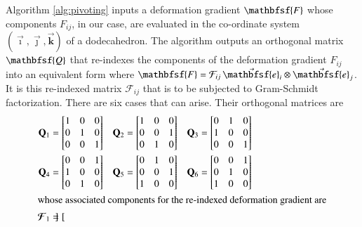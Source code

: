 Algorithm \ref{alg:pivoting} inputs a deformation gradient $\mathbfsf{F}$ whose components $F_{ij}$, in our case, are evaluated in the co-ordinate system $(  \vec{\boldsymbol{\imath}} , \vec{\boldsymbol{\jmath}} , \vec{\boldsymbol{k}} )$ of a dodecahedron.  The algorithm outputs an orthogonal matrix $\mathbfsf{Q}$ that re-indexes the components of the deformation gradient $F_{ij}$ into an equivalent form where $\mathbfsf{F} = \mathcal{F}_{ij} \, \vec{\mathbfsf{e}}_i \otimes \vec{\mathbfsf{e}}_j$.  It is this re-indexed matrix $\mathcal{F}_{ij}$ that is to be subjected to Gram-Schmidt factorization.  There are six cases that can arise.  Their orthogonal matrices are
\begin{subequations}
    \begin{align}
    \mathbf{Q}_1 & = \begin{bmatrix}
    1 & 0 & 0\\
    0 & 1 & 0\\
    0 & 0 & 1
    \end{bmatrix} & 
    \mathbf{Q}_2 & = \begin{bmatrix}
    1 & 0 & 0\\
    0 & 0 & 1\\
    0 & 1 & 0
    \end{bmatrix} &
    \mathbf{Q}_3 & = \begin{bmatrix}
    0 & 1 & 0\\
    1 & 0 & 0\\
    0 & 0 & 1
    \end{bmatrix} \notag \\
    \mathbf{Q}_4 & = 
    \begin{bmatrix}
    0 & 0 & 1\\
    1 & 0 & 0\\
    0 & 1 & 0
    \end{bmatrix} & 
    \mathbf{Q}_5 & = \begin{bmatrix}
    0 & 1 & 0\\
    0 & 0 & 1\\
    1 & 0 & 0
    \end{bmatrix} &
    \mathbf{Q}_6 & = \begin{bmatrix}
    0 & 0 & 1\\
    0 & 1 & 0\\
    1 & 0 & 0
    \end{bmatrix} \\
    \intertext{whose associated components for the re-indexed deformation gradient are}
    \boldsymbol{\mathcal{F}}_1 & = \begin{bmatrix}

\end{bmatrix}
\end{align}
\end{subequations}

